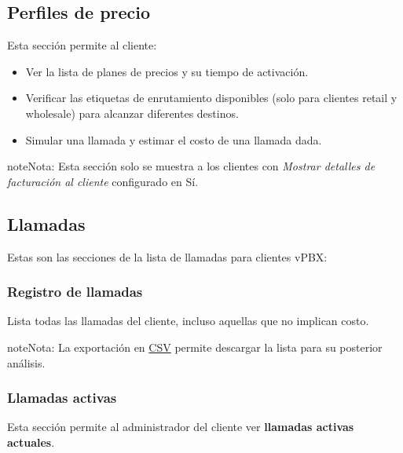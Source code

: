\documentclass[letterpaper,10pt,spanish]{sphinxmanual}
\begin{document}
\subsection{Perfiles de precio}
\label{administration_portal/client/vpbx/rating_profiles:rating-profiles}\label{administration_portal/client/vpbx/rating_profiles::doc}
Esta sección permite al cliente:
\begin{itemize}
\item {} 
Ver la lista de planes de precios y su tiempo de activación.

\item {} 
Verificar las etiquetas de enrutamiento disponibles (solo para clientes retail y wholesale) para alcanzar diferentes destinos.

\item {} 
Simular una llamada y estimar el costo de una llamada dada.

\end{itemize}

\begin{notice}{note}{Nota:}
Esta sección solo se muestra a los clientes con \emph{Mostrar detalles de facturación al cliente} configurado en Sí.
\end{notice}


\subsection{Llamadas}
\label{administration_portal/client/vpbx/calls/index::doc}\label{administration_portal/client/vpbx/calls/index:calls}
Estas son las secciones de la lista de llamadas para clientes vPBX:


\subsubsection{Registro de llamadas}
\label{administration_portal/client/vpbx/calls/call_registry::doc}\label{administration_portal/client/vpbx/calls/call_registry:call-registry}\label{administration_portal/client/vpbx/calls/call_registry:id1}
Lista todas las llamadas del cliente, incluso aquellas que no implican costo.

\begin{notice}{note}{Nota:}
La exportación en \href{https://es.wikipedia.org/wiki/CSV}{CSV} permite descargar la lista para su posterior análisis.
\end{notice}


\subsubsection{Llamadas activas}
\label{administration_portal/client/vpbx/calls/active_calls::doc}\label{administration_portal/client/vpbx/calls/active_calls:active-calls}
Esta sección permite al administrador del cliente ver \textbf{llamadas activas actuales}.
\end{document}
